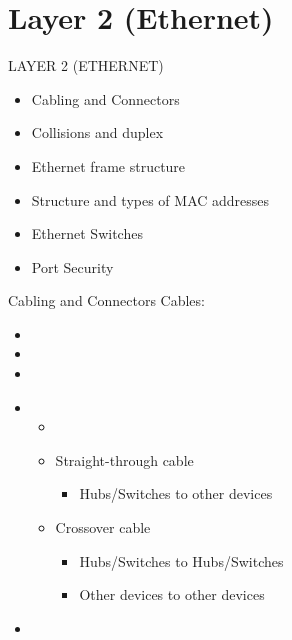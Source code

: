 \section[ethr]{Layer 2 (Ethernet)}

\begin{frame}{LAYER 2 (ETHERNET)}
	\begin{itemize}
		\item Cabling and Connectors
		\item Collisions and duplex
		\item Ethernet frame structure
		\item Structure and types of MAC addresses
		\item Ethernet Switches
		\item Port Security
	\end{itemize}
\end{frame}

\begin{frame}{Cabling and Connectors}
	Cables:\pause
	\begin{itemize}[<+->]
		\item {}
		\item {}
		\item {}
	\end{itemize}
	\pause
	\begin{itemize}[<+->]
		\item {}
		\begin{itemize}
			\item {}
			\item Straight-through cable
			\begin{itemize}
				\item Hubs/Switches to other devices
			\end{itemize}
			\item Crossover cable
			\begin{itemize}
				\item Hubs/Switches to Hubs/Switches
				\item Other devices to other devices
			\end{itemize}
		\end{itemize}
		\item {}
	\end{itemize}
\end{frame}

